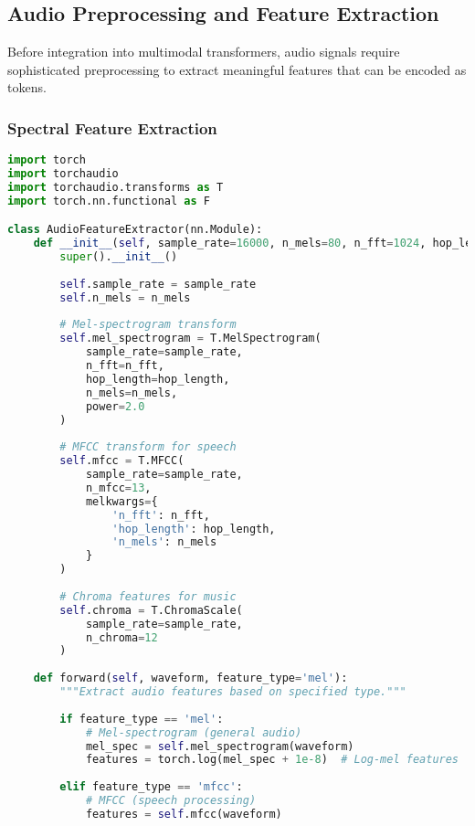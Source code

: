 \subsection{Audio Preprocessing and Feature Extraction}

Before integration into multimodal transformers, audio signals require sophisticated preprocessing to extract meaningful features that can be encoded as tokens.

\subsubsection{Spectral Feature Extraction}

\begin{lstlisting}[language=Python, caption=Audio feature extraction for token generation]
import torch
import torchaudio
import torchaudio.transforms as T
import torch.nn.functional as F

class AudioFeatureExtractor(nn.Module):
    def __init__(self, sample_rate=16000, n_mels=80, n_fft=1024, hop_length=160):
        super().__init__()
        
        self.sample_rate = sample_rate
        self.n_mels = n_mels
        
        # Mel-spectrogram transform
        self.mel_spectrogram = T.MelSpectrogram(
            sample_rate=sample_rate,
            n_fft=n_fft,
            hop_length=hop_length,
            n_mels=n_mels,
            power=2.0
        )
        
        # MFCC transform for speech
        self.mfcc = T.MFCC(
            sample_rate=sample_rate,
            n_mfcc=13,
            melkwargs={
                'n_fft': n_fft,
                'hop_length': hop_length,
                'n_mels': n_mels
            }
        )
        
        # Chroma features for music
        self.chroma = T.ChromaScale(
            sample_rate=sample_rate,
            n_chroma=12
        )
        
    def forward(self, waveform, feature_type='mel'):
        """Extract audio features based on specified type."""
        
        if feature_type == 'mel':
            # Mel-spectrogram (general audio)
            mel_spec = self.mel_spectrogram(waveform)
            features = torch.log(mel_spec + 1e-8)  # Log-mel features
            
        elif feature_type == 'mfcc':
            # MFCC (speech processing)
            features = self.mfcc(waveform)
            

\end{lstlisting}
